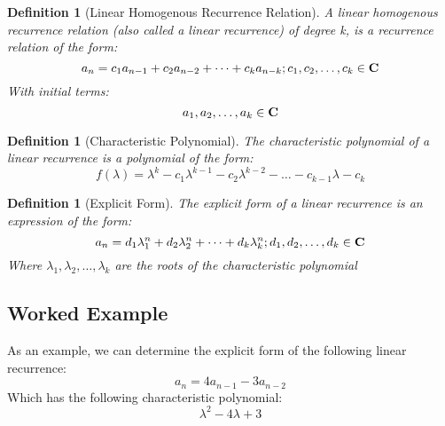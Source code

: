 \documentclass[11pt]{article}
\newtheorem{definition}[theorem]{Definition}
\begin{document}
\begin{definition}[Linear Homogenous Recurrence Relation] A linear homogenous recurrence relation (also called a linear recurrence) of degree \mbox{k}, is a recurrence relation of the form:
    $$a_n=c_1a_{n-1}+c_2a_{n-2}+\dots +c_ka_{n-k}; c_1,c_2,\dots,c_k\in \mbox{\textbf{C}}$$ 
    With initial terms: 
    $$a_1,a_2,\dots,a_k\in\mbox{\textbf{C}}$$
\end{definition}

\begin{definition}[Characteristic Polynomial] The characteristic polynomial of a linear recurrence is a polynomial of the form:
    $$f(\lambda) = \lambda^{k}-c_1\lambda^{k-1}-c_2\lambda^{k-2}-\dots-c_{k-1}\lambda-c_k$$ 
\end{definition}

\begin{definition}[Explicit Form] The explicit form of a linear recurrence is an expression of the form:
    $$a_n=d_1\lambda_1^n+d_2\lambda_2^n+\dots+d_k\lambda_k^n; d_1,d_2,\dots,d_k \in\mbox{\textbf{C}}$$ 
    Where \mbox{$\lambda_1,\lambda_2,\dots,\lambda_k$} are the roots of the characteristic polynomial
\end{definition}

\doublespacing
\subsection{Worked Example}
As an example, we can determine the explicit form of the following linear recurrence:
$$a_n=4a_{n-1}-3a_{n-2}$$
Which has the following characteristic polynomial:
$$\lambda^2-4\lambda+3$$
\end{document}
